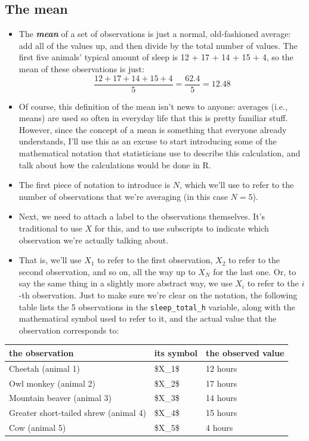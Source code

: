 \documentclass[
]{book}
\begin{document}
\hypertarget{mean}{%
\subsection{The mean}\label{mean}}

\begin{itemize}
\item
  The \textbf{\emph{mean}} of a set of observations is just a normal, old-fashioned average: add all of the values up, and then divide by the total number of values. The first five animals' typical amount of sleep is 12 + 17 + 14 + 15 + 4, so the mean of these observations is just:
  \[
  \frac{12 + 17 + 14 + 15 + 4}{5} = \frac{62.4}{5} = 12.48
  \]
\item
  Of course, this definition of the mean isn't news to anyone: averages (i.e., means) are used so often in everyday life that this is pretty familiar stuff. However, since the concept of a mean is something that everyone already understands, I'll use this as an excuse to start introducing some of the mathematical notation that statisticians use to describe this calculation, and talk about how the calculations would be done in R.
\item
  The first piece of notation to introduce is \(N\), which we'll use to refer to the number of observations that we're averaging (in this case \(N = 5\)).
\item
  Next, we need to attach a label to the observations themselves. It's traditional to use \(X\) for this, and to use subscripts to indicate which observation we're actually talking about.
\item
  That is, we'll use \(X_1\) to refer to the first observation, \(X_2\) to refer to the second observation, and so on, all the way up to \(X_N\) for the last one. Or, to say the same thing in a slightly more abstract way, we use \(X_i\) to refer to the \(i\)-th observation. Just to make sure we're clear on the notation, the following table lists the 5 observations in the \texttt{sleep\_total\_h} variable, along with the mathematical symbol used to refer to it, and the actual value that the observation corresponds to:
\end{itemize}

\begin{tabular}{lll}
\toprule
the observation & its symbol & the observed value\\
\midrule
Cheetah (animal 1) & \$X\_1\$ & 12 hours\\
Owl monkey (animal 2) & \$X\_2\$ & 17 hours\\
Mountain beaver (animal 3) & \$X\_3\$ & 14 hours\\
Greater short-tailed shrew (animal 4) & \$X\_4\$ & 15 hours\\
Cow (animal 5) & \$X\_5\$ & 4 hours\\
\bottomrule
\end{tabular}
\end{document}

